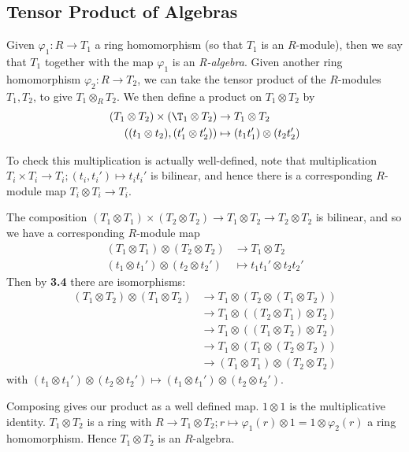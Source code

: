 \documentclass[10pt,a4paper]{article}
\begin{document}
\subsection{Tensor Product of Algebras}
\begin{definition}
  Given $\varphi_1:R \to T_1$ a ring homomorphism (so that $T_1$ is an $R$-module), then we say that $T_1$ together with the map $\varphi_1$ is an \emph{R-algebra}. Given another ring homomorphism $\varphi_2 : R \to T_2$, we can take the tensor product of the $R$-modules $T_1, T_2$, to give $T_1 \otimes_R T_2$. We then define a product on $T_1 \otimes T_2$ by
  \begin{align*}
    (T_1\otimes T_2) \times (\T_1 \otimes T_2) &\to T_1\otimes T_2\\
    ((t_1\otimes t_2), (t_1'\otimes t_2'))&\mapsto (t_1t_1')\otimes (t_2t_2')
  \end{align*}
\end{definition}
To check this multiplication is actually well-defined, note that multiplication $T_i \times T_i \to T_i; (t_i, t_i') \mapsto t_it_i'$ is bilinear, and hence there is a corresponding $R$-module map $T_i \otimes T_i \to T_i$.

The composition $(T_1\otimes T_1)\times (T_2 \otimes T_2) \to T_1\otimes T_2 \to T_2\otimes T_2$ is bilinear, and so we have a corresponding $R$-module map
\begin{align*}
  (T_1 \otimes T_1) \otimes (T_2\otimes T_2) &\to T_1\otimes T_2\\
  (t_1\otimes t_1') \otimes (t_2\otimes t_2') &\mapsto t_1t_1'\otimes t_2t_2'
\end{align*}
Then by \textbf{3.4} there are isomorphisms:
\begin{align*}
  (T_1\otimes T_2)\otimes (T_1\otimes T_2) & \to T_1 \otimes (T_2 \otimes (T_1\otimes T_2))\\
  &\to T_1 \otimes ((T_2\otimes T_1)\otimes T_2)\\
  &\to T_1 \otimes ((T_1 \otimes T_2)\otimes T_2)\\
  &\to T_1\otimes (T_1\otimes (T_2\otimes T_2))\\
  &\to (T_1\otimes T_1)\otimes (T_2 \otimes T_2)
\end{align*}
with $(t_1\otimes t_1')\otimes (t_2\otimes t_2') \mapsto (t_1\otimes t_1')\otimes (t_2\otimes t_2')$.

Composing gives our product as a well defined map. $1\otimes 1$ is the multiplicative identity. $T_1 \otimes T_2$ is a ring with $R \to T_1\otimes T_2; r\mapsto \varphi_1(r)\otimes 1 = 1 \otimes \varphi_2(r)$ a ring homomorphism. Hence $T_1 \otimes T_2$ is an $R$-algebra.
\end{document}
